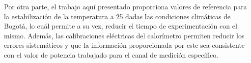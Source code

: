 Por otra parte, el trabajo aquí presentado proporciona valores de referencia para la estabilización de la temperatura a 25 \grad{} dadas las condiciones climáticas de Bogotá, lo cuál permite a su vez, reducir el tiempo de experimentación con el mismo. Además, las calibraciones eléctricas del calorímetro permiten reducir los errores sistem\'aticos y que la información proporcionada por este sea consistente con el valor de potencia trabajado para el canal de medición específico.

